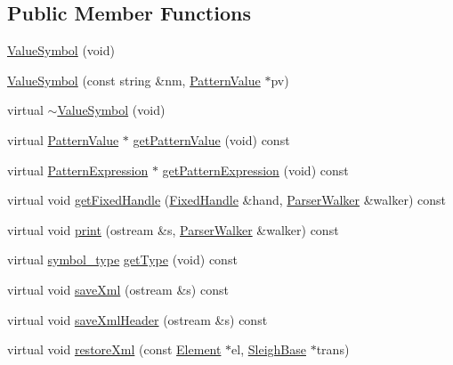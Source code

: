 \subsection*{Public Member Functions}
\begin{DoxyCompactItemize}
\item 
\mbox{\hyperlink{class_value_symbol_a2286e5135aa61b94d70dbc9aa2838e13}{Value\+Symbol}} (void)
\item 
\mbox{\hyperlink{class_value_symbol_a62f46fb6b06d7a923521f84a8d32c684}{Value\+Symbol}} (const string \&nm, \mbox{\hyperlink{class_pattern_value}{Pattern\+Value}} $\ast$pv)
\item 
virtual \mbox{\hyperlink{class_value_symbol_afd7f520755d6be30812f5df293d527f4}{$\sim$\+Value\+Symbol}} (void)
\item 
virtual \mbox{\hyperlink{class_pattern_value}{Pattern\+Value}} $\ast$ \mbox{\hyperlink{class_value_symbol_a449457fadde51b9fe2c3a8d3a76966c9}{get\+Pattern\+Value}} (void) const
\item 
virtual \mbox{\hyperlink{class_pattern_expression}{Pattern\+Expression}} $\ast$ \mbox{\hyperlink{class_value_symbol_aa35d8513d3b3cb589d05128fb46f23fc}{get\+Pattern\+Expression}} (void) const
\item 
virtual void \mbox{\hyperlink{class_value_symbol_a8eeefeaf224149a7f81a301dc505a705}{get\+Fixed\+Handle}} (\mbox{\hyperlink{struct_fixed_handle}{Fixed\+Handle}} \&hand, \mbox{\hyperlink{class_parser_walker}{Parser\+Walker}} \&walker) const
\item 
virtual void \mbox{\hyperlink{class_value_symbol_a82b3d3fbfc6d3ed118103f12220cdfd4}{print}} (ostream \&s, \mbox{\hyperlink{class_parser_walker}{Parser\+Walker}} \&walker) const
\item 
virtual \mbox{\hyperlink{class_sleigh_symbol_aba70f7f332fd63488c5ec4bd7807db41}{symbol\+\_\+type}} \mbox{\hyperlink{class_value_symbol_aa134aca647315ca414f6e4e4a246c9ae}{get\+Type}} (void) const
\item 
virtual void \mbox{\hyperlink{class_value_symbol_aa7b4012d522c5864aea52486b0d47978}{save\+Xml}} (ostream \&s) const
\item 
virtual void \mbox{\hyperlink{class_value_symbol_a7b1c84bd9d7e84f9272d448d10c31200}{save\+Xml\+Header}} (ostream \&s) const
\item 
virtual void \mbox{\hyperlink{class_value_symbol_af9104983ea7381b608fe56b5ab8a2d7c}{restore\+Xml}} (const \mbox{\hyperlink{class_element}{Element}} $\ast$el, \mbox{\hyperlink{class_sleigh_base}{Sleigh\+Base}} $\ast$trans)
\end{DoxyCompactItemize}
